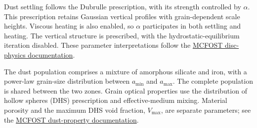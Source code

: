 \documentclass[11pt,a4paper]{article}
\begin{document}
Dust settling follows the Dubrulle prescription, with its strength
controlled by $\alpha$. This prescription retains Gaussian vertical
profiles with grain-dependent scale heights. Viscous heating is also
enabled, so $\alpha$ participates in both settling and heating. The
vertical structure is prescribed, with the hydrostatic-equilibrium
iteration disabled. These parameter interpretations follow the
\href{https://mcfost.readthedocs.io/en/latest/parameter_file.html\#disk-physics}
{MCFOST disc-physics documentation}.

The dust population comprises a mixture of amorphous silicate and iron,
with a power-law grain-size distribution between $a_{\min}$ and
$a_{\max}$. The complete population is shared between the two zones.
Grain optical properties use the distribution of hollow spheres (DHS)
prescription and effective-medium mixing. Material porosity and the
maximum DHS void fraction, $V_{\max}$, are separate parameters; see the
\href{https://mcfost.readthedocs.io/en/latest/parameter_file.html\#grain-properties}
{MCFOST dust-property documentation}.
\end{document}
